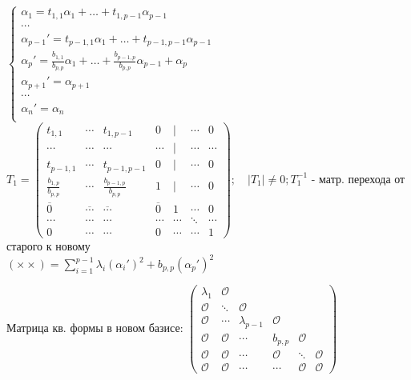 \begin{enumerate}
\begin{enumerate}
$\left\{ 
 \begin{matrix}
  \alpha_1 = t_{1,1}\alpha_1 + \ldots + t_{1,p-1} \alpha_{p-1} \\
  \cdots \\
  \alpha_{p-1}' = t_{p-1,1}\alpha_1 + \ldots + t_{p-1, p-1} \alpha_{p-1} \\
  \alpha_p' = \frac{b_{1,1}}{b_{p,p}}\alpha_1 + \ldots + \frac{b_{p-1,p}}{b_{p,p}}\alpha_{p-1} + \alpha_p \\
  \alpha_{p+1}' = \alpha_{p+1} \\
  \cdots \\
  \alpha_n' = \alpha_n \\
 \end{matrix} \right.
$ \\

$T_1 = 
\begin{pmatrix}
 t_{1,1} & \cdots & t_{1,p-1} & 0 & | & \cdots & 0 \\
 \cdots & \cdots & \cdots & \cdots & | & \cdots & \cdots \\
 t_{p-1, 1} & \cdots & t_{p-1, p-1} & 0 & | & \cdots & 0 \\
 \frac{b_{1,p}}{b_{p,p}} & \cdots & \frac{b_{p-1,p}}{b_{p,p}} & 1 & | & \cdots & 0 \\
 \overline{0} & \overline{\cdots} & \overline{\cdots} & \overline{0} & 1  & \cdots & 0 \\
 \cdots & \cdots & \cdots & \cdots & \cdots &\ddots & \cdots \\
 0 & \cdots & \cdots & 0 & \cdots & \cdots & 1 
\end{pmatrix};\quad |T_1| \ne 0; T_1^{-1} $ - матр. перехода от старого к новому\\

$(\times \times) = \sum\limits_{i=1}^{p-1} \lambda_i (\alpha_i')^2 + b_{p,p} (\alpha_p')^2$

Матрица кв. формы в новом базисе: 
$\begin{pmatrix}
  \lambda_1 & \mathcal{O}\\
  \mathcal{O} & \ddots & \mathcal{O} \\
  \mathcal{O} & \cdots & \lambda_{p-1} & \mathcal{O} \\
  \mathcal{O} & \mathcal{O} & \cdots & b_{p,p} & \mathcal{O} \\
  \mathcal{O} & \mathcal{O} & \cdots & \mathcal{O} & \ddots & \mathcal{O} \\
  \mathcal{O} & \mathcal{O} & \cdots & \cdots & \mathcal{O} & \mathcal{O}
 \end{pmatrix}
$
\end{enumerate}

\end{enumerate}







